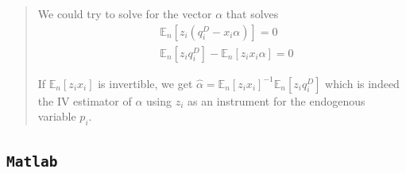 \documentclass[12pt,]{book}
\begin{document}
\begin{quote}
We could try to solve for the vector \(\alpha\) that solves
\[
\begin{aligned}
& \mathbb E_n[z_i (q_i^D - x_i\alpha)] = 0 \\
& \mathbb E_n[z_i q_i^D] -  \mathbb E_n[z_ix_i\alpha] = 0 
\end{aligned}
\]

If \(\mathbb E_n[z_ix_i]\) is invertible, we get \(\hat{\alpha} = \mathbb E_n[z_ix_i]^{-1} \mathbb E_n[z_i q^D_i]\) which is indeed the IV estimator of \(\alpha\) using \(z_i\) as an instrument for the endogenous variable \(p_i\).
\end{quote}

\hypertarget{matlab-6}{%
\subsection{\texorpdfstring{\texttt{Matlab}}{Matlab}}\label{matlab-6}}
\end{document}
